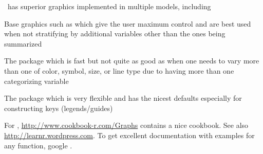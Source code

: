 \R\ has superior graphics implemented in multiple models, including
\bi
\item Base graphics such as 
  which give the user maximum control and are best used when not
  stratifying by additional variables other than the ones being summarized
\item The  package which is fast but not quite as good as
   when one needs to vary more than one of color, symbol,
  size, or line type due to having more than one categorizing variable
\item The  package which is very flexible and has the
  nicest defaults especially for constructing keys (legends/guides)
\ei

For , \url{http://www.cookbook-r.com/Graphs} contains a
nice cookbook.  See also \url{http://learnr.wordpress.com}.  To get
excellent documentation with examples for any 
 function, google .

